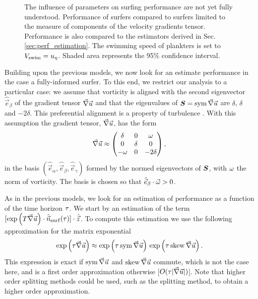 \begin{figure}%
	\centering
	
	\caption[The influence of parameters on surfing performance are not yet fully understood.]{
		The influence of parameters on surfing performance are not yet fully understood.
		Performance of surfers compared to surfers limited to the measure of components of the velocity gradients tensor.
		Performance is also compared to the estimators derived in Sec.\ref{sec:perf_estimation}.
		The swimming speed of plankters is set to $V_{\mathrm{swim}} = u_{\eta}$.
		Shaded area represents the 95\% confidence interval.
	}
	\label{fig:surfing_partial_and_models}
\end{figure}

Building upon the previous models, we now look for an estimate performance in the case a fully-informed surfer.
To this end, we restrict our analysis to a particular case: we assume that vorticity is aligned with the second eigenvector $\hat{\vec{e}}_\beta$ of the gradient tensor $\vec{\nabla} \vec{u}$ and that the eigenvalues of $\boldsymbol{S} = \operatorname{sym} \vec{\nabla} \vec{u}$ are $\delta$, $\delta$ and $-2\delta$.
This preferential alignment is a property of turbulence \citep{ashurst1987alignment, tsinober1992experimental, gulitski2007velocity}.
With this assumption the gradient tensor, $\vec{\nabla} \vec{u}$, has the form
\begin{equation}\label{turb:eq:gradient_tensor_model}
	\vec{\nabla} \vec{u} \approx \begin{pmatrix}
		\delta & 0 & \omega\\
		0 & \delta & 0\\
		-\omega & 0 & -2\delta
	\end{pmatrix},
\end{equation}
in the basis $(\hat{\vec{e}}_\alpha, \hat{\vec{e}}_\beta, \hat{\vec{e}}_\gamma)$ formed by the normed eigenvectors of $\boldsymbol{S}$, with $\omega$ the norm of vorticity.
The basis is chosen so that $\hat{\vec{e}}_\beta \cdot \vec{\omega} > 0$.

As in the previous models, we look for an estimation of performance as a function of the time horizon $\tau$.
We start by an estimation of the term $[ \exp \left( T \vec{\nabla} \vec{u} \right) \cdot \hat{\vec{n}}_{\mathrm{surf}}(\tau)] \cdot \hat{\vec{z}}$.
To compute this estimation  we use the following approximation for the matrix exponential
\begin{equation}\label{turb:eq:splitting}
	\exp \left( \tau \vec{\nabla} \vec{u} \right) \approx \exp \left( \tau \operatorname{sym} \vec{\nabla} \vec{u} \right) \, \exp \left( \tau \operatorname{skew} \vec{\nabla} \vec{u} \right).
\end{equation}
This expression is exact if $\operatorname{sym} \vec{\nabla} \vec{u}$ and $\operatorname{skew} \vec{\nabla} \vec{u}$ commute, which is not the case here, and is a first order approximation otherwise [$O(\tau \lvert \vec{\nabla} \vec{u}\rvert)$].
Note that higher order splitting methods could be used, such as the \citet{strang1968construction} splitting method, to obtain a higher order approximation.

